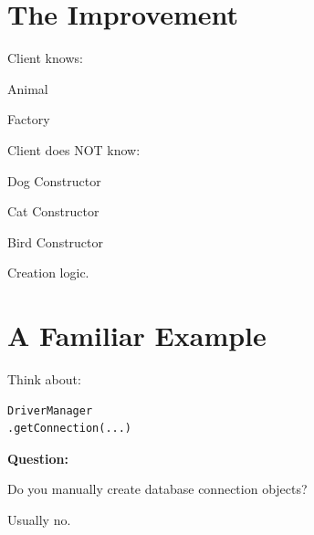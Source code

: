 \documentclass[11pt,a4paper]{book}
\begin{document}
\section{The Improvement}

Client knows:


Animal


Factory


Client does NOT know:


Dog Constructor


Cat Constructor


Bird Constructor


Creation logic.


\section{A Familiar Example}

Think about:

\begin{verbatim}
DriverManager
.getConnection(...)
\end{verbatim}


\textbf{Question:}


Do you manually create
database connection objects?


Usually no.
\end{document}
